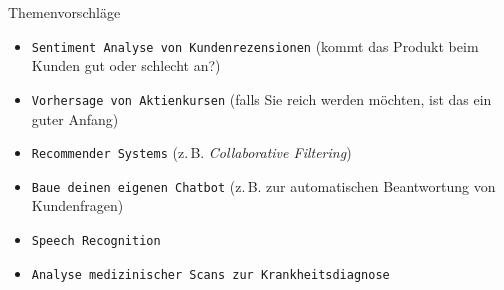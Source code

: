 \begin{dwHeaderFrame}{Themenvorschläge}
	\begin{itemize} 
		\item \texttt{Sentiment Analyse von Kundenrezensionen} (kommt das Produkt beim Kunden gut oder schlecht an?)
		\item \texttt{Vorhersage von Aktienkursen} (falls Sie reich werden möchten, ist das ein guter Anfang)
		\item \texttt{Recommender Systems} (z.\,B. \textit{Collaborative Filtering})
		\item \texttt{Baue deinen eigenen Chatbot} (z.\,B. zur automatischen Beantwortung von Kundenfragen)
		\item \texttt{Speech Recognition}
		\item \texttt{Analyse medizinischer Scans zur Krankheitsdiagnose}
	\end{itemize}
\end{dwHeaderFrame}

